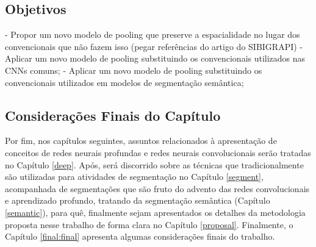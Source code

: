 \subsection{Objetivos}
\label{intro:objective}
- Propor um novo modelo de pooling que preserve a espacialidade no lugar dos convencionais que não fazem isso (pegar referências do artigo do SIBIGRAPI)
- Aplicar um novo modelo de pooling substituindo os convencionais utilizados nas CNNs comuns;
- Aplicar um novo modelo de pooling substituindo os convencionais utilizados em modelos de segmentação semântica;

\subsection{Considerações Finais do Capítulo}
\label{intro:end}
Por fim, nos capítulos seguintes, assuntos relacionados à apresentação de conceitos de redes neurais profundas e redes neurais convolucionais serão tratadas no Capítulo \ref{deep}. Após, será discorrido sobre as técnicas que tradicionalmente são utilizadas para atividades de segmentação no Capítulo \ref{segment}, acompanhada de segmentações que são fruto do advento das redes convolucionais e aprendizado profundo, tratando da segmentação semântica (Capítulo \ref{semantic}), para quê, finalmente sejam apresentados os detalhes da metodologia proposta nesse trabalho de forma clara no Capítulo \ref{proposal}.  Finalmente, o Capítulo \ref{final:final} apresenta algumas considerações finais do trabalho.